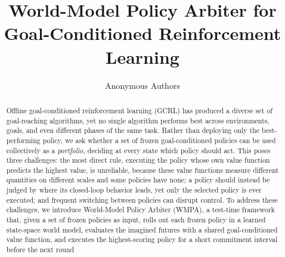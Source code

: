 \documentclass{article}
\title{World-Model Policy Arbiter for\\
Goal-Conditioned Reinforcement Learning}
\author{Anonymous Authors}
\date{}
\theoremstyle{plain}
\theoremstyle{definition}
\theoremstyle{plain}
\newcommand{\wmpa}{\textsc{WMPA}}
\begin{document}
\maketitle
\ificlrfinal
\else
\fi

\begin{abstract}
Offline goal-conditioned reinforcement learning (GCRL) has produced a diverse set of goal-reaching algorithms, yet no single algorithm performs best across environments, goals, and even different phases of the same task.
Rather than deploying only the best-performing policy, we ask whether a set of frozen goal-conditioned policies can be used collectively as a \emph{portfolio}, deciding at every state which policy should act.
This poses three challenges:
the most direct rule, executing the policy whose own value function predicts the highest value, is unreliable, because these value functions measure different quantities on different scales and some policies have none;
a policy should instead be judged by where its closed-loop behavior leads, yet only the selected policy is ever executed;
and frequent switching between policies can
disrupt control.
To address these challenges, we introduce World-Model Policy Arbiter (\wmpa), a test-time framework that, given a set of frozen policies as input, rolls out each frozen policy in a learned state-space world model, evaluates the imagined futures with a shared goal-conditioned value function, and executes the highest-scoring policy for a short commitment interval before the next round

\end{abstract}
\end{document}

